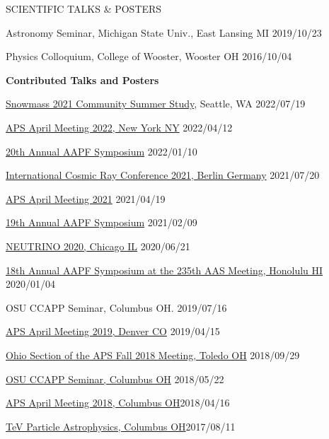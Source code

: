 \documentclass{resume} %
\begin{document}
\begin{rSection}{SCIENTIFIC TALKS \& POSTERS}
\begin{etaremune}
\item Astronomy Seminar, Michigan State Univ., East Lansing MI \hfill 2019/10/23

\item Physics Colloquium, College of Wooster, Wooster OH \hfill 2016/10/04

\end{etaremune}

{\bf Contributed Talks and Posters}
\begin{etaremune}
\item \href{https://indico.fnal.gov/event/22303/contributions/245833/}{Snowmass 2021 Community Summer Study}, Seattle, WA  \hfill 2022/07/19
\item \href{https://meetings.aps.org/Meeting/APR22/Session/Y09.1}{APS April Meeting 2022, New York NY} \hfill 2022/04/12
\item \href{https://aapf-fellows.org/symposium/2022}{20th Annual AAPF Symposium} \hfill 2022/01/10
\item \href{https://indico.desy.de/event/27991/contributions/102162/}{International Cosmic Ray Conference 2021, Berlin Germany} \hfill 2021/07/20
\item \href{http://meetings.aps.org/Meeting/APR21/Session/T18}{APS April Meeting 2021} \hfill 2021/04/19
\item \href{https://sites.google.com/view/aapf2021/schedule}{19th Annual AAPF Symposium} \hfill 2021/02/09
\item \href{https://indico.fnal.gov/event/19348/contributions/186681/}{NEUTRINO 2020, Chicago IL} \hfill 2020/06/21
\item \href{https://aapf-fellows.org/symposium/2020#BrianClark}{18th Annual AAPF Symposium at the 235th AAS Meeting, Honolulu HI} \hfill 2020/01/04
\item OSU CCAPP Seminar, Columbus OH. \hfill 2019/07/16
\item \href{http://meetings.aps.org/Meeting/APR19/Session/R08.4}{APS April Meeting 2019, Denver CO} \hfill 2019/04/15
\item \href{http://meetings.aps.org/Meeting/OSF18/Session/A01.2}{Ohio Section of the APS Fall 2018 Meeting, Toledo OH} \hfill 2018/09/29
\item \href{http://ccapp.osu.edu/pastseminars.html#past}{OSU CCAPP Seminar, Columbus OH} \hfill 2018/05/22
\item \href{http://meetings.aps.org/Meeting/APR18/Session/U17.7}{APS April Meeting 2018, Columbus OH}\hfill 2018/04/16
\item \href{http://indico.cern.ch/event/615891/contributions/2648790/}{TeV Particle Astrophysics, Columbus OH}\hfill 2017/08/11

\end{etaremune}
\end{rSection}
\end{document}
